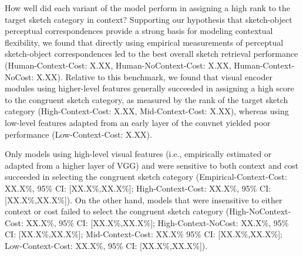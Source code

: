 \documentclass[9pt,twocolumn,twoside]{pnas-new}
\newcommand{\mwu}[1]{{\color{green}{[mwu: #1]}}}
\begin{document}

How well did each variant of the model perform in assigning a high rank to the target sketch category in context? Supporting our hypothesis that sketch-object perceptual correspondences provide a strong basis for modeling contextual flexibility, we found that directly using empirical measurements of perceptual sketch-object correspondences led to the best overall sketch retrieval performance (Human-Context-Cost: X.XX, Human-NoContext-Cost: X.XX, Human-Context-NoCost: X.XX). Relative to this benchmark, we found that visual encoder modules using higher-level features generally succeeded in assigning a high score to the congruent sketch category, as measured by the rank of the target sketch category (High-Context-Cost: X.XX, Mid-Context-Cost: X.XX), whereas using low-level features adapted from an early layer of the convnet yielded poor performance (Low-Context-Cost: X.XX).


Only models using high-level visual features (i.e., empirically estimated or adapted from a higher layer of VGG) and were sensitive to both context and cost succeeded in selecting the congruent sketch category (Empirical-Context-Cost: XX.X\%, 95\% CI: [XX.X\%,XX.X\%]; High-Context-Cost: XX.X\%, 95\% CI: [XX.X\%,XX.X\%]). On the other hand, models that were insensitive to either context or cost failed to select the congruent sketch category (High-NoContext-Cost: XX.X\%, 95\% CI: [XX.X\%,XX.X\%]; High-Context-NoCost: XX.X\%, 95\% CI: [XX.X\%,XX.X\%]; Mid-Context-Cost: XX.X\% 95\% CI: [XX.X\%,XX.X\%]; Low-Context-Cost: XX.X\%, 95\% CI: [XX.X\%,XX.X\%]).
\end{document}
